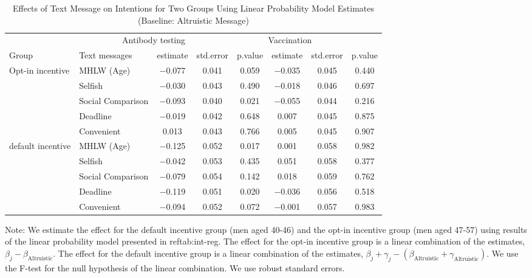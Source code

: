 \begin{table}

\caption{Effects of Text Message on Intentions for Two Groups Using Linear Probability Model Estimates (Baseline: Altruistic Message) \label{tab:int-reg-ftest2}}
\centering
\fontsize{9}{11}\selectfont
\begin{threeparttable}
\begin{tabular}[t]{>{\raggedright\arraybackslash}p{5em}lcccccc}
\toprule
\multicolumn{2}{c}{ } & \multicolumn{3}{c}{Antibody testing} & \multicolumn{3}{c}{Vaccination} \\
\cmidrule(l{3pt}r{3pt}){3-5} \cmidrule(l{3pt}r{3pt}){6-8}
Group & Text messages & estimate & std.error & p.value & estimate  & std.error  & p.value \\
\midrule
Opt-in incentive & MHLW (Age) & \num{-0.077} & \num{0.041} & \num{0.059} & \num{-0.035} & \num{0.045} & \num{0.440}\\
 & Selfish & \num{-0.030} & \num{0.043} & \num{0.490} & \num{-0.018} & \num{0.046} & \num{0.697}\\
 & Social Comparison & \num{-0.093} & \num{0.040} & \num{0.021} & \num{-0.055} & \num{0.044} & \num{0.216}\\
 & Deadline & \num{-0.019} & \num{0.042} & \num{0.648} & \num{0.007} & \num{0.045} & \num{0.875}\\
 & Convenient & \num{0.013} & \num{0.043} & \num{0.766} & \num{0.005} & \num{0.045} & \num{0.907}\\
default incentive & MHLW (Age) & \num{-0.125} & \num{0.052} & \num{0.017} & \num{0.001} & \num{0.058} & \num{0.982}\\
 & Selfish & \num{-0.042} & \num{0.053} & \num{0.435} & \num{0.051} & \num{0.058} & \num{0.377}\\
 & Social Comparison & \num{-0.079} & \num{0.054} & \num{0.142} & \num{0.018} & \num{0.059} & \num{0.762}\\
 & Deadline & \num{-0.119} & \num{0.051} & \num{0.020} & \num{-0.036} & \num{0.056} & \num{0.518}\\
 & Convenient & \num{-0.094} & \num{0.052} & \num{0.072} & \num{-0.001} & \num{0.057} & \num{0.983}\\
\bottomrule
\end{tabular}
\begin{tablenotes}
\item Note: We estimate the effect for the default incentive group (men aged 40-46) and the opt-in incentive group (men aged 47-57) using results of the linear probability model presented in ref{tab:int-reg}. The effect for the opt-in incentive group is a linear combination of the estimates, $\beta_j - \beta_{\text{Altruistic}}$. The effect for the default incentive group is a linear combination of the estimates, $\beta_j + \gamma_j - (\beta_{\text{Altruistic}} + \gamma_{\text{Altruistic}})$. We use the F-test for the null hypothesis of the linear combination. We use robust standard errors.
\end{tablenotes}
\end{threeparttable}
\end{table}
